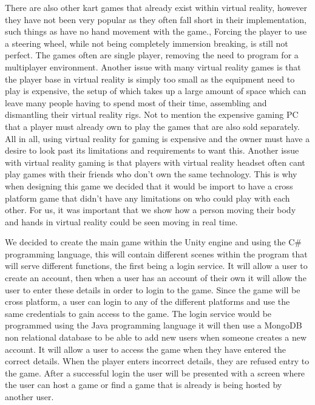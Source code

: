 There are also other kart games that already exist within virtual reality, however they have not been very popular as they often fall short in their implementation, such things as have no hand movement with the game., Forcing the player to use a steering wheel, while not being completely immersion breaking, is still not perfect. The games often are single player, removing the need to program for a multiplayer environment. Another issue with many virtual reality games is that the player base in virtual reality is simply too small as the equipment need to play is expensive, the setup of which takes up a large amount of space which can leave many people having to spend most of their time, assembling and dismantling their virtual reality rigs. Not to mention the expensive gaming PC that a player must already own to play the games that are also sold separately. All in all, using virtual reality for gaming is expensive and the owner must have a desire to look past its limitations and requirements to want this. Another issue with virtual reality gaming is that players with virtual reality headset often cant play games with their friends who don't own the same technology. This is why when designing this game we decided that it would be import to have a cross platform game that didn't have any limitations on who could play with each other. For us, it was important that we show how a person moving their body and hands in virtual reality could be seen moving in real time.
\newline

We decided to create the main game within the Unity engine and using the C\# programming language, this will contain different scenes within the program that will serve different functions, the first being a login service. It will allow a user to create an account, then when a user has an account of their own it will allow the user to enter these details in order to login to the game. Since the game will be cross platform, a user can login to any of the different platforms and use the same credentials to gain access to the game. The login service would be programmed using the Java programming language it will then use a MongoDB non relational database to be able to add new users when someone creates a new account. It will allow a user to access the game when they have entered the correct details. When the player enters incorrect details, they are refused entry to the game. After a successful login the user will be presented with a screen where the user can host a game or find a game that is already is being hosted by another user.\newline  

